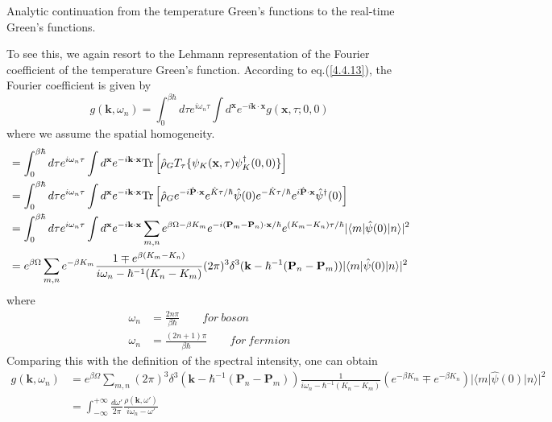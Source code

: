 \begin{center}
Analytic continuation from the temperature Green's functions to the real-time Green's functions.
\end{center}
 To see this, we again resort to the Lehmann representation of the Fourier coefficient of the temperature Green's function.
 According to eq.(\ref{4.4.13}), the Fourier coefficient is given by
\[
g(\mathbf{k},\omega_n)=\int_0^{\beta\hbar} d\tau e^{i\omega_n\tau} \int d^\mathbf{x} e^{-i\mathbf{k}\cdot \mathbf{x}} g(\mathbf{x},\tau;0,0)
\]
where we assume the spatial homogeneity.
\begin{equation}
\begin{aligned}
&=\int_0^{\beta\hbar} d\tau e^{i\omega_n\tau} \int d^\mathbf{x} e^{-i\mathbf{k}\cdot \mathbf{x}} \text{Tr} \left[ \hat \rho_G T_\tau \{ \psi_K(\mathbf{x},\tau) \psi_K^\dag (0,0) \} \right]\\
&=\int_0^{\beta\hbar} d\tau e^{i\omega_n\tau} \int d^\mathbf{x} e^{-i\mathbf{k}\cdot \mathbf{x}} \text{Tr} \left[ \hat \rho_G e^{-i\hat{\mathbf{P}}\cdot \mathbf{x}} e^{\hat K \tau/\hbar} \hat \psi (0) e^{-\hat K \tau/\hbar} e^{i\hat{\mathbf{P}}\cdot \mathbf{x}} \hat \psi^\dag (0) \right]\\
&=\int_0^{\beta\hbar} d\tau e^{i\omega_n\tau} \int d^\mathbf{x} e^{-i\mathbf{k}\cdot \mathbf{x}} \sum_{m,n} e^{\beta\Omega-\beta K_m} e^{-i(\mathbf{P}_m-\mathbf{P}_n)\cdot \mathbf x/\hbar} e^{(K_m-K_n)\tau/\hbar} |\langle m|\hat \psi (0)|n\rangle|^2\\
&=e^{\beta\Omega} \sum_{m,n} e^{-\beta K_m} \frac{1\mp e^{\beta(K_m-K_n)}}{i\omega_n-\hbar^{-1}(K_n-K_m)} (2\pi)^3 \delta^3(\mathbf k-\hbar^{-1}(\mathbf P_n -\mathbf P_m)) |\langle m|\hat \psi (0)|n\rangle|^2
\end{aligned}
\end{equation}
where
\[
\begin{aligned}
\omega_n&=\frac{2n\pi}{\beta\hbar} \qquad for \ boson\\
\omega_n&=\frac{(2n+1)\pi}{\beta\hbar} \qquad for \ fermion
\end{aligned}
\]
Comparing this with the definition of the spectral intensity, one can obtain
\begin{equation}
\begin{aligned}
g(\mathbf{k},\omega_n)&=e^{\beta\Omega} \sum_{m,n} (2\pi)^3 \delta^3(\mathbf k-\hbar^{-1}(\mathbf P_n -\mathbf P_m)) \frac{1}{i\omega_n-\hbar^{-1}(K_n-K_m)} \left( e^{-\beta K_m} \mp e^{-\beta K_n} \right) |\langle m|\hat \psi (0)|n\rangle|^2 \\
&=\int_{-\infty}^{+\infty} \frac{d\omega'}{2\pi} \frac{\rho(\mathbf k,\omega')}{i\omega_n-\omega'}
\end{aligned}
\end{equation}
